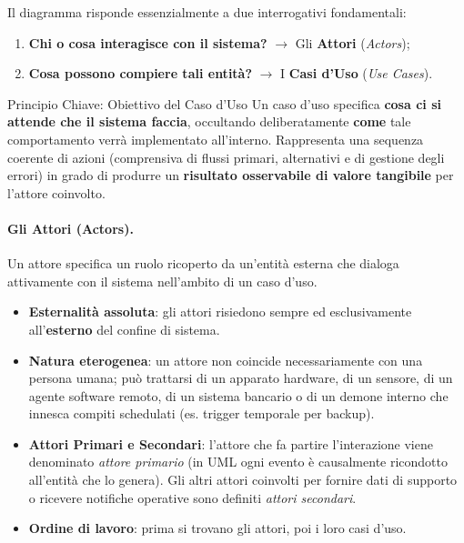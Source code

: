 \documentclass[12pt]{extarticle}
\begin{document}
\medskip
\noindent Il diagramma risponde essenzialmente a due interrogativi fondamentali:
\begin{enumerate}
    \item \textbf{Chi o cosa interagisce con il sistema?} $\to$ Gli \textbf{Attori} (\textit{Actors});
    \item \textbf{Cosa possono compiere tali entità?} $\to$ I \textbf{Casi d'Uso} (\textit{Use Cases}).
\end{enumerate}

\begin{cbox}{Principio Chiave: Obiettivo del Caso d'Uso}
\noindent Un caso d'uso specifica \textbf{cosa ci si attende che il sistema faccia}, occultando deliberatamente \textbf{come} tale comportamento verrà implementato all'interno. Rappresenta una sequenza coerente di azioni (comprensiva di flussi primari, alternativi e di gestione degli errori) in grado di produrre un \textbf{risultato osservabile di valore tangibile} per l'attore coinvolto.
\end{cbox}

\paragraph{Gli Attori (Actors).}
Un attore specifica un ruolo ricoperto da un'entità esterna che dialoga attivamente con il sistema nell'ambito di un caso d'uso.
\begin{itemize}
    \item \textbf{Esternalità assoluta}: gli attori risiedono sempre ed esclusivamente all'\textbf{esterno} del confine di sistema.
    \item \textbf{Natura eterogenea}: un attore non coincide necessariamente con una persona umana; può trattarsi di un apparato hardware, di un sensore, di un agente software remoto, di un sistema bancario o di un demone interno che innesca compiti schedulati (es. trigger temporale per backup).
    \item \textbf{Attori Primari e Secondari}: l'attore che fa partire l'interazione viene denominato \textit{attore primario} (in UML ogni evento è causalmente ricondotto all'entità che lo genera). Gli altri attori coinvolti per fornire dati di supporto o ricevere notifiche operative sono definiti \textit{attori secondari}.
    \item \textbf{Ordine di lavoro}: prima si trovano gli attori, poi i loro casi d'uso.
\end{itemize}
\end{document}
